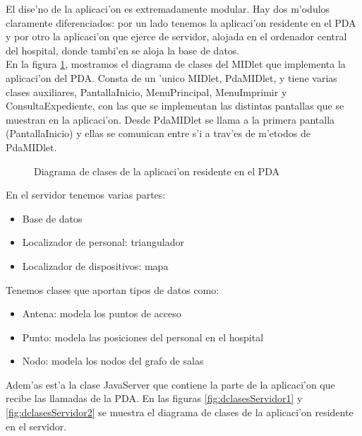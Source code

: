 El dise'no de la aplicaci'on es extremadamente modular. Hay dos m'odulos claramente diferenciados: por un lado tenemos la aplicaci'on residente en el PDA y por otro la aplicaci'on que ejerce de servidor, alojada en el ordenador central del hospital, donde tambi'en se aloja la base de datos.\bigskip \\ En la figura \ref{fig:dclasesPDA}, mostramos el diagrama de clases del MIDlet que implementa la aplicaci'on del PDA. Consta de un 'unico MIDlet, PdaMIDlet, y tiene varias clases auxiliares, PantallaInicio, MenuPrincipal, MenuImprimir y ConsultaExpediente,  con las que se implementan las distintas pantallas que se muestran en la aplicaci'on. Desde PdaMIDlet se llama a la primera pantalla (PantallaInicio) y ellas se comunican entre s'i a trav'es de m'etodos de PdaMIDlet.

\begin{figure}[h!]
	\begin{center}
     	\end{center}
    	\caption{Diagrama de clases de la aplicaci'on residente en el PDA}
	\label{fig:dclasesPDA}
\end{figure}
En el servidor tenemos varias partes:
\begin{itemize}
	\item Base de datos
	\item Localizador de personal: triangulador
	\item Localizador de dispositivos: mapa
\end{itemize}
Tenemos clases que aportan tipos de datos como: 
\begin{itemize}
	\item Antena: modela los puntos de acceso
	\item Punto: modela las posiciones del personal en el hospital
	\item Nodo: modela los nodos del grafo de salas
\end{itemize}
Adem'as est'a la clase JavaServer que contiene la parte de la aplicaci'on que recibe las llamadas de la PDA.
En las figuras \ref{fig:dclasesServidor1} y \ref{fig:dclasesServidor2} se muestra el diagrama de clases de la aplicaci'on residente en el servidor.

